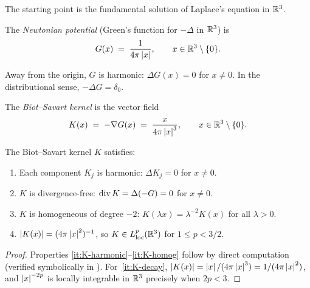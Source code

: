 The starting point is the fundamental solution of Laplace's equation in $\mathbb{R}^3$.

\begin{definition}\label{def:newtonian-potential}
  The \emph{Newtonian potential} (Green's function for $-\Delta$ in $\mathbb{R}^3$) is
  \begin{equation}\label{eq:green-fn}
    G(x) \;=\; \frac{1}{4\pi \left\lvert x \right\rvert}, \qquad x \in \mathbb{R}^3 \setminus \{0\}.
  \end{equation}
\end{definition}

Away from the origin, $G$ is harmonic: $\Delta G(x) = 0$ for $x \neq 0$.
In the distributional sense, $-\Delta G = \delta_0$.

\begin{definition}\label{def:bs-kernel}
  The \emph{Biot--Savart kernel} is the vector field
  \begin{equation}\label{eq:bs-kernel}
    K(x) \;=\; -\nabla G(x) \;=\; \frac{x}{4\pi\left\lvert x \right\rvert^3},
    \qquad x \in \mathbb{R}^3 \setminus \{0\}.
  \end{equation}
\end{definition}

\begin{proposition}\label{prop:kernel-props}
  The Biot--Savart kernel $K$ satisfies:
  \begin{enumerate}[label=(\roman*)]
    \item\label{it:K-harmonic} Each component $K_j$ is harmonic: $\Delta K_j = 0$ for
      $x \neq 0$.
    \item\label{it:K-divfree} $K$ is divergence-free: $\operatorname{div} K = \Delta(-G) = 0$
      for $x \neq 0$.
    \item\label{it:K-homog} $K$ is homogeneous of degree $-2$:
      $K(\lambda x) = \lambda^{-2} K(x)$ for all $\lambda > 0$.
    \item\label{it:K-decay} $\left\lvert K(x) \right\rvert = (4\pi\left\lvert x \right\rvert^2)^{-1}$, so $K \in L^{p}_{\mathrm{loc}}(\mathbb{R}^3)$ for $1 \leq p < 3/2$.
  \end{enumerate}
\end{proposition}

\begin{proof}
  Properties \ref{it:K-harmonic}--\ref{it:K-homog} follow by direct computation
  (verified symbolically in ).  For~\ref{it:K-decay}, $\left\lvert K(x) \right\rvert
  = \left\lvert x \right\rvert/(4\pi\left\lvert x \right\rvert^3) = 1/(4\pi\left\lvert x \right\rvert^2)$, and $\left\lvert x \right\rvert^{-2p}$ is locally
  integrable in $\mathbb{R}^3$ precisely when $2p < 3$.
\end{proof}

